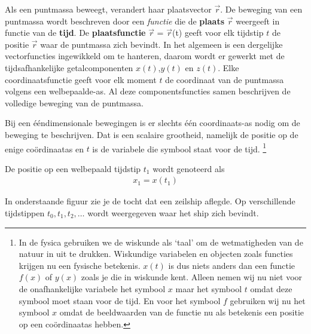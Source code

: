 \documentclass{ximera}
\begin{document}
Als een puntmassa beweegt, verandert haar plaatsvector \(\vec{r}\).  
De beweging van een puntmassa wordt beschreven door een \textit{functie} die de \textbf{plaats} \(\vec{r}\) weergeeft in functie van de \textbf{tijd}. 
De \textbf{plaatsfunctie} \(\vec{r}\) = \(\vec{r}\)(t) geeft voor elk tijdstip \(t\) de positie \(\vec{r}\) waar de puntmassa zich bevindt. 
In het algemeen is een dergelijke vectorfuncties ingewikkeld om te hanteren, daarom wordt er gewerkt met de tijdsafhankelijke getalcomponenten \(x(t)\),\(y(t)\) en \(z(t)\).
Elke coordinaatsfunctie geeft voor elk moment \(t\) de coordinaat van de puntmassa volgens een welbepaalde-as. 
Al deze componentsfuncties samen beschrijven de volledige beweging van de puntmassa. 


Bij een ééndimensionale bewegingen is er slechts één coordinaats-as nodig om de beweging te beschrijven. 
Dat is een scalaire grootheid, namelijk de positie op de enige coördinaatas
en $t$ is de variabele die symbool staat voor de tijd.
\footnote{In de fysica gebruiken we de wiskunde als `taal' om de wetmatigheden van de natuur in uit te drukken. 
Wiskundige variabelen en objecten zoals functies krijgen nu een fysische betekenis. 
$x(t)$ is dus niets anders dan een functie $f(x)$ of $y(x)$ zoals je die in wiskunde kent. 
Alleen nemen wij nu niet voor de onafhankelijke variabele het symbool $x$ maar het symbool $t$ omdat deze symbool moet staan voor de tijd. 
En voor het symbool $f$ gebruiken wij nu het symbool $x$ omdat de beeldwaarden van de functie nu als betekenis een positie op een coördinaatas hebben.}


De positie op een welbepaald tijdstip $t_1$ wordt genoteerd als 
\begin{eqnarray*}
x_1=x(t_1)
\end{eqnarray*}

In onderstaande figuur zie je de tocht dat een zeilship aflegde. 
Op verschillende tijdstippen $t_0,t_1, t_2,\ldots$ wordt weergegeven waar het ship zich bevindt. 


\end{document}
